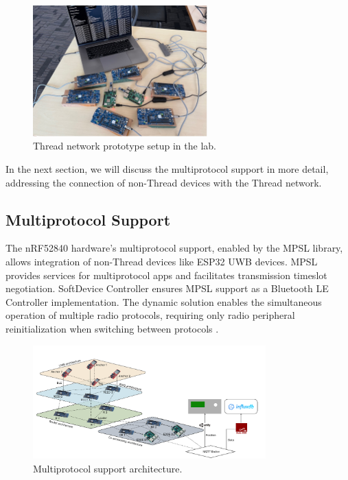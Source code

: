 \begin{figure}[H]
    \centering
    \includegraphics[width=0.6\textwidth]{images/research_design/prototype_setup.jpg}
    \caption{Thread network prototype setup in the lab.}
    \label{fig:prototype_setup}
\end{figure}

In the next section, we will discuss the multiprotocol support in more detail, addressing the connection of non-Thread devices with the Thread network.


\subsection{Multiprotocol Support}\label{sec:multiprotocol_support}
The nRF52840 hardware’s multiprotocol support, enabled by the MPSL library, allows integration of non-Thread devices like ESP32 UWB devices. MPSL provides services for multiprotocol apps and facilitates transmission timeslot negotiation. SoftDevice Controller ensures MPSL support as a Bluetooth LE Controller implementation. The dynamic solution enables the simultaneous operation of multiple radio protocols, requiring only radio peripheral reinitialization when switching between protocols \cite{nordic_multiprotocol_support}.

\begin{figure}[h]
    \centering
    \includegraphics[width=0.8\textwidth]{images/research_design/multiprotocol_support.png}
    \caption{Multiprotocol support architecture.}
    \label{fig:multiprotocol_support}
\end{figure}

